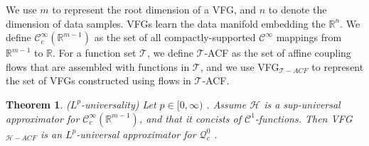 \documentclass[sigconf, anonymous, review]{acmart}
\theoremstyle{plain}
\newtheorem{theorem}{Theorem}[section]
\theoremstyle{definition}
\theoremstyle{remark}
\begin{document}
We use $m$ to represent the root dimension of a VFG, and $n$ to denote the dimension of data samples. VFGs learn the data manifold embedding the $\mathbb{R}^n$. We define $\mathcal{C}_c^{\infty}(\mathbb{R}^{m-1})$ as the set of all compactly-supported $\mathcal{C}^{\infty}$ mappings from $\mathbb{R}^{m-1}$ to $\mathbb{R}$. For a function set $\mathcal{T}$, we define $\mathcal{T}$-ACF as the set of affine coupling flows that  are assembled  with functions in $\mathcal{T}$, and  we use VFG$_{\mathcal{T}-ACF}$ to represent the set of VFGs constructed using flows in $\mathcal{T}$-ACF. 



\begin{theorem} \label{thm:lp_univ}
($L^p$-universality) Let $p \in [0, \infty)$ . Assume $\mathcal{H}$ is a sup-universal approximator for $\mathcal{C}_c^{\infty}(\mathbb{R}^{m-1})$, and that it concists of $\mathcal{C}^1$-functions. Then  VFG$_{\mathcal{H}-ACF}$ is an $L^p$-universal approximator for $\mathcal{Q}_c^0$ . 
\end{theorem}
\end{document}
